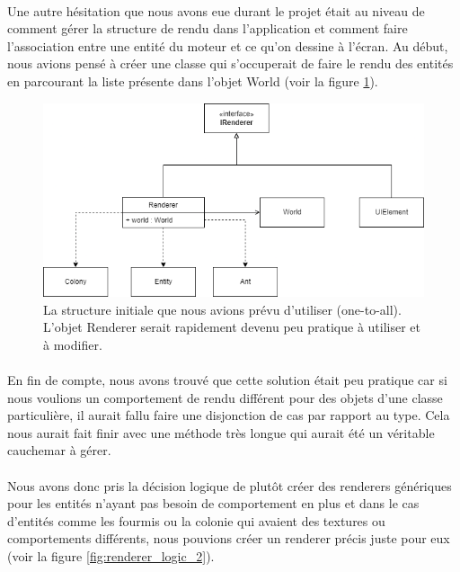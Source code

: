 \documentclass{EPUProjetDi}
\begin{document}
\paragraph{}
Une autre hésitation que nous avons eue durant le projet était au niveau de comment gérer la structure de rendu dans l'application et comment 
faire l'association entre une entité du moteur et ce qu'on dessine à l'écran. Au début, nous avions pensé à créer une classe qui s'occuperait de faire le rendu des
entités en parcourant la liste présente dans l'objet World (voir la figure \ref{fig:renderer_logic_1}). 

\begin{figure}[h]
    \centering
    \includegraphics[scale=0.5]{renderer_logic_1.png}
    \caption{La structure initiale que nous avions prévu d'utiliser (one-to-all). L'objet Renderer serait rapidement devenu peu pratique à utiliser et à modifier.}
    \label{fig:renderer_logic_1}
\end{figure}

\paragraph{}
En fin de compte, nous avons trouvé que cette solution était peu pratique car si nous voulions un comportement 
de rendu différent pour des objets d'une classe particulière, il aurait fallu faire une disjonction de cas par rapport au type. Cela nous aurait fait finir avec
une méthode très longue qui aurait été un véritable cauchemar à gérer. 

\paragraph{}
Nous avons donc pris la décision logique de plutôt créer des renderers génériques pour les entités n'ayant pas besoin de comportement 
en plus et dans le cas d'entités comme les fourmis ou la colonie qui avaient des textures ou comportements différents, nous pouvions créer un renderer
précis juste pour eux (voir la figure \ref{fig:renderer_logic_2}).
\end{document}
